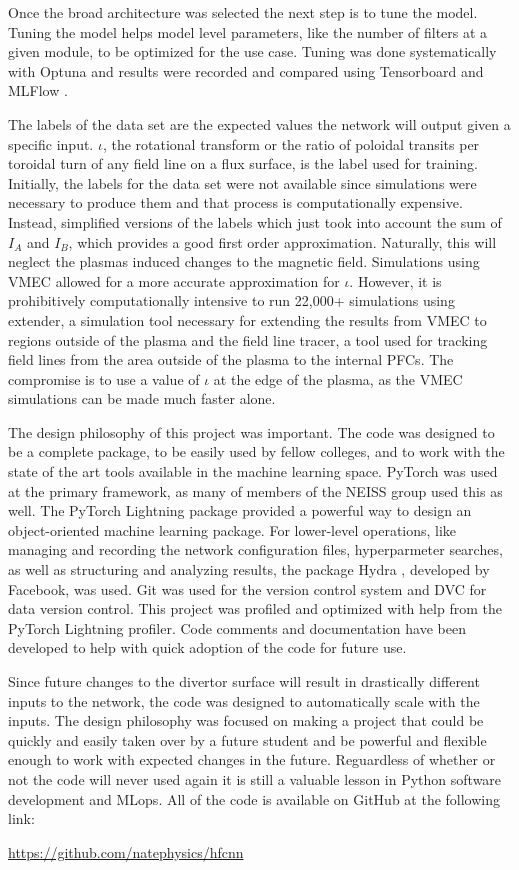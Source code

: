 \label{sec:code:hyperparameters}

Once the broad architecture was selected the next step is to tune the model. Tuning the model helps model level parameters, like the number of filters at a given module, to be optimized for the use case. Tuning was done systematically with Optuna \cite{optuna} and results were recorded and compared using Tensorboard \cite{tensorboard} and MLFlow \cite{mlflow}.

The labels of the data set are the expected values the network will output given a specific input. $\iota$, the rotational transform or the ratio of poloidal transits per toroidal turn of any field line on a flux surface, is the label used for training. Initially, the labels for the data set were not available since simulations were necessary to produce them and that process is computationally expensive. Instead, simplified versions of the labels which just took into account the sum of $I_A$ and $I_B$, which provides a good first order approximation. Naturally, this will neglect the plasmas induced changes to the magnetic field. Simulations using VMEC allowed for a more accurate approximation for $\iota$. However, it is prohibitively computationally intensive to run 22,000+ simulations using extender, a simulation tool necessary for extending the results from VMEC to regions outside of the plasma and the field line tracer, a tool used for tracking field lines from the area outside of the plasma to the internal PFCs. The compromise is to use a value of $\iota$ at the edge of the plasma, as the VMEC simulations can be made much faster alone.

\label{sec:code:philosophy}
The design philosophy of this project was important. The code was designed to be a complete package, to be easily used by fellow colleges, and to work with the state of the art tools available in the machine learning space. PyTorch \cite{pytorch} was used at the primary framework, as many of members of the NEISS group used this as well. The PyTorch Lightning \cite{pytorch_lightning} package provided a powerful way to design an object-oriented machine learning package. For lower-level operations, like managing and recording the network configuration files, hyperparmeter searches, as well as structuring and analyzing results, the package Hydra \cite{hydra}, developed by Facebook, was used. Git \cite{git} was used for the version control system and DVC \cite{dvc} for data version control. This project was profiled and optimized with help from the PyTorch Lightning profiler. Code comments and documentation have been developed to help with quick adoption of the code for future use.

Since future changes to the divertor surface will result in drastically different inputs to the network, the code was designed to automatically scale with the inputs. The design philosophy was focused on making a project that could be quickly and easily taken over by a future student and be powerful and flexible enough to work with expected changes in the future. Reguardless of whether or not the code will never used again it is still a valuable lesson in Python software development and MLops. All of the code is available on GitHub at the following link:

\url{https://github.com/natephysics/hfcnn}